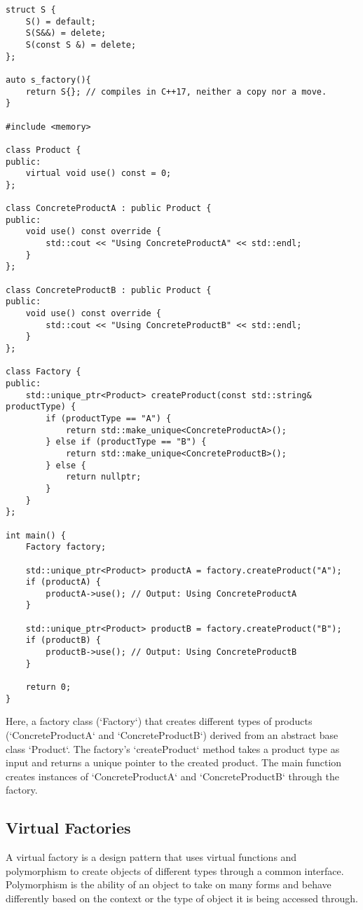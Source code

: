 \documentclass[openany]{report}
\begin{document}
\begin{verbatim}
struct S {
    S() = default;
    S(S&&) = delete;
    S(const S &) = delete;
};

auto s_factory(){
    return S{}; // compiles in C++17, neither a copy nor a move.
}

#include <memory>

class Product {
public:
    virtual void use() const = 0;
};

class ConcreteProductA : public Product {
public:
    void use() const override {
        std::cout << "Using ConcreteProductA" << std::endl;
    }
};

class ConcreteProductB : public Product {
public:
    void use() const override {
        std::cout << "Using ConcreteProductB" << std::endl;
    }
};

class Factory {
public:
    std::unique_ptr<Product> createProduct(const std::string& productType) {
        if (productType == "A") {
            return std::make_unique<ConcreteProductA>();
        } else if (productType == "B") {
            return std::make_unique<ConcreteProductB>();
        } else {
            return nullptr;
        }
    }
};

int main() {
    Factory factory;
    
    std::unique_ptr<Product> productA = factory.createProduct("A");
    if (productA) {
        productA->use(); // Output: Using ConcreteProductA
    }
    
    std::unique_ptr<Product> productB = factory.createProduct("B");
    if (productB) {
        productB->use(); // Output: Using ConcreteProductB
    }
    
    return 0;
}

\end{verbatim}

Here, a factory class (`Factory`) that creates different types of products
(`ConcreteProductA` and `ConcreteProductB`) derived from an abstract base class `Product`.
The factory's `createProduct` method takes a product type as input and returns a unique pointer to the created product.
The main function creates instances of `ConcreteProductA` and `ConcreteProductB` through the factory.

\subsection{Virtual Factories}
A virtual factory is a design pattern that uses virtual functions and 
polymorphism to create objects of different types through a common interface.
Polymorphism is the ability of an object to take on many forms
and behave differently based on the context or the type of object it is being accessed through.
\end{document}
